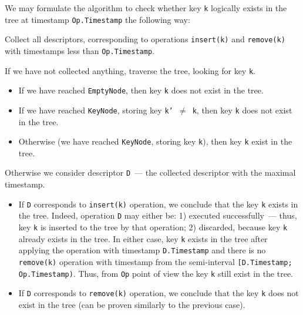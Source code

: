 \documentclass[times, dvipsnames,%
               languages={russian,english} %
              ]{itmo-student-thesis}
\begin{document}
We may formulate the algorithm to check whether key \texttt{k} logically exists in the tree at timestamp \texttt{Op.Timestamp} the following way:

\begin{nenum}
    \item Collect all descriptors, corresponding to operations \texttt{insert(k)} and \texttt{remove(k)} with timestamps less than \texttt{Op.Timestamp}.
    
    \item If we have not collected anything, traverse the tree, looking for key \texttt{k}.
    
    \begin{itemize}
        \item If we have reached \texttt{EmptyNode}, then key \texttt{k} does not exist in the tree.
        
        \item If we have reached \texttt{KeyNode}, storing key \texttt{k' $\neq$ k}, then key \texttt{k} does not exist in the tree.
        
        \item Otherwise (we have reached \texttt{KeyNode}, storing key \texttt{k}), then key \texttt{k} exist in the tree.
    \end{itemize}
    
    \item Otherwise we consider descriptor \texttt{D}~--- the collected descriptor with the maximal timestamp. 
    
       \begin{itemize}
            \item If \texttt{D} corresponds to \texttt{insert(k)} operation, we conclude that the key \texttt{k} exists in the tree. Indeed, operation \texttt{D} may either be: 1) executed successfully~--- thus, key \texttt{k} is inserted to the tree by that operation; 2) discarded, because key \texttt{k} already exists in the tree. In either case, key \texttt{k} exists in the tree after applying the operation with timestamp \texttt{D.Timestamp} and there is no \texttt{remove(k)} operation with timestamp from the semi-interval \texttt{[D.Timestamp; Op.Timestamp)}. Thus, from \texttt{Op} point of view the key \texttt{k} still exist in the tree.
            
            \item If \texttt{D} corresponds to \texttt{remove(k)} operation, we conclude that the key \texttt{k} does not exist in the tree (can be proven similarly to the previous case).
        \end{itemize}
\end{nenum}
\end{document}
